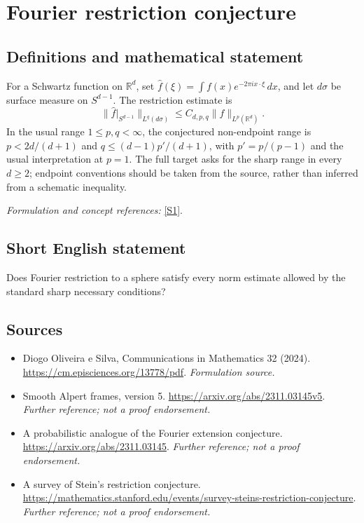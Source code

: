 \documentclass[11pt]{article}
\begin{document}
\section*{\texorpdfstring{Fourier restriction conjecture}{Fourier restriction conjecture}}\label{46}
\subsection{Definitions and mathematical statement}
For a Schwartz function on ${\mathbb{R}}^d$, set $\widehat f(\xi)=\int f(x)e^{-2\pi i x\cdot\xi}\,dx$, and let $d\sigma$ be surface measure on $S^{d-1}$. The restriction estimate is
\[
 \|\widehat f|_{S^{d-1}}\|_{L^q(d\sigma)}\le C_{d,p,q}\|f\|_{L^p({\mathbb{R}}^d)}.
\]
In the usual range $1\le p,q<\infty$, the conjectured non-endpoint range is $p<2d/(d+1)$ and $q\le (d-1)p'/(d+1)$, with $p'=p/(p-1)$ and the usual interpretation at $p=1$. The full target asks for the sharp range in every $d\ge2$; endpoint conventions should be taken from the source, rather than inferred from a schematic inequality.
\par\smallskip\textit{Formulation and concept references:} \href{https://cm.episciences.org/13778/pdf}{[S1]}.

\subsection{Short English statement}
Does Fourier restriction to a sphere satisfy every norm estimate allowed by the standard sharp necessary conditions?
\subsection{Sources}
\begin{itemize}
\item[S1]Diogo Oliveira e Silva, Communications in Mathematics 32 (2024).
\url{https://cm.episciences.org/13778/pdf}.
\textit{Formulation source.}
\item[S2]Smooth Alpert frames, version 5.
\url{https://arxiv.org/abs/2311.03145v5}.
\textit{Further reference; not a proof endorsement.}
\item[S3]A probabilistic analogue of the Fourier extension conjecture.
\url{https://arxiv.org/abs/2311.03145}.
\textit{Further reference; not a proof endorsement.}
\item[S4]A survey of Stein's restriction conjecture.
\url{https://mathematics.stanford.edu/events/survey-steins-restriction-conjecture}.
\textit{Further reference; not a proof endorsement.}
\end{itemize}
\end{document}
